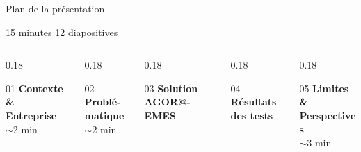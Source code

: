 \documentclass[aspectratio=169, 10pt]{beamer}
\begin{document}
\begin{frame}{Plan de la présentation}
  \begin{center}
    {\small 15 minutes \textbar{} 12 diapositives}
  \end{center}
  \vspace{0.3cm}
  \begin{columns}[T]
    \begin{column}{0.18\textwidth}
      \begin{block}{\centering\scriptsize 01}
        \centering\tiny\textbf{Contexte \&\\Entreprise}\\[2pt]
        \textcolor{EMESgray}{\tiny $\sim$2 min}
      \end{block}
    \end{column}
    \begin{column}{0.18\textwidth}
      \begin{block}{\centering\scriptsize 02}
        \centering\tiny\textbf{Problé-\\matique}\\[2pt]
        \textcolor{EMESgray}{\tiny $\sim$2 min}
      \end{block}
    \end{column}
    \begin{column}{0.18\textwidth}
      \begin{alertblock}{\centering\scriptsize 03}
        \centering\tiny\textbf{Solution\\AGOR@-EMES}\\[2pt]
        \textcolor{white}{\tiny $\sim$4 min}
      \end{alertblock}
    \end{column}
    \begin{column}{0.18\textwidth}
      \begin{alertblock}{\centering\scriptsize 04}
        \centering\tiny\textbf{Résultats\\des tests}\\[2pt]
        \textcolor{white}{\tiny $\sim$4 min}
      \end{alertblock}
    \end{column}
    \begin{column}{0.18\textwidth}
      \begin{block}{\centering\scriptsize 05}
        \centering\tiny\textbf{Limites \&\\Perspectives}\\[2pt]
        \textcolor{EMESgray}{\tiny $\sim$3 min}

\end{block}
\end{column}
\end{columns}
\end{frame}
\end{document}
